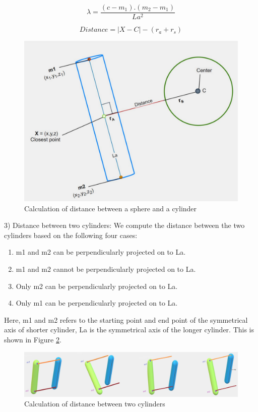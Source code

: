\documentclass[a4paper, 11.5pt, conference]{ieeeconf}      %
\begin{document}
\begin{equation}
	\lambda = \frac{(c-m_1).(m_2-m_1)}{La^2}
\end{equation}

\begin{equation}
	Distance = |X-C| - (r_a + r_s)
\end{equation}

\begin{figure}[H]
    \centering
    \includegraphics[scale=0.3]{images/sphere_capsule.png}
    \caption{Calculation of distance between a sphere and a cylinder}
    \label{fig:spherecapsule}
\end{figure}

3) Distance between two cylinders:
We compute the distance between the two cylinders based on the following four cases:
\begin{enumerate}
	\item m1 and m2 can be perpendicularly projected on to La.
	\item m1 and m2 cannot be perpendicularly projected on to La.
	\item Only m2 can be perpendicularly projected on to La.
	\item Only m1 can be perpendicularly projected on to La.
\end{enumerate}
Here, m1 and m2 refers to the starting point and end point of the symmetrical axis of shorter cylinder, La is the symmetrical axis of the longer cylinder. This is shown in Figure \ref{fig:capsule_capsule}.
\begin{figure}[H]
    \centering
    \includegraphics[scale=0.21]{images/capsule_capsule.png}
    \caption{Calculation of distance between two cylinders}
    \label{fig:capsule_capsule}
\end{figure}
\end{document}
